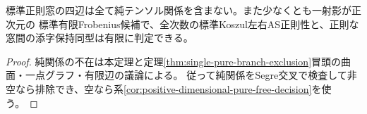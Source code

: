 \begin{corollary}\label{cor:all-positive-dimensional-window-decision}
標準正則窓の四辺は全て純テンソル関係を含まない。また少なくとも一射影が正次元の
標準有限Frobenius候補で、全次数の標準Koszul左右AS正則性と、正則な窓間の添字保持同型は有限に判定できる。
\end{corollary}
\begin{proof}
純関係の不在は本定理と定理\ref{thm:single-pure-branch-exclusion}冒頭の曲面・一点グラフ・有限辺の議論による。
従って純関係をSegre交叉で検査して非空なら排除でき、空なら系\ref{cor:positive-dimensional-pure-free-decision}を使う。
\end{proof}
